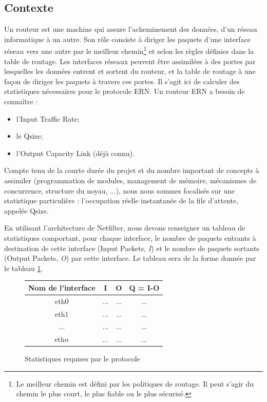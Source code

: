\documentclass[a4paper]{article}
\begin{document}
\subsection{Contexte}
Un routeur est une machine qui assure l’acheminement des données,
d'un réseau informatique à un autre. Son rôle consiste à diriger
les paquets d'une interface réseau vers une autre par le meilleur chemin\footnote{Le meilleur chemin est défini par
les politiques de routage. Il peut s'agir du chemin le plus court, le plus fiable ou le plus sécurisé.} et selon les règles définies dans la table de
routage. 
Les interfaces réseaux peuvent être assimilées à des
portes par lesquelles les données entrent et sortent du routeur, et
la table de routage à une façon de diriger les paquets à travers
ces portes.
Il s'agit ici de calculer des statistiques nécessaires 
pour le protocole ERN. Un routeur ERN a besoin de connaître :
\begin{itemize}
	\item l'Input Traffic Rate;
	\item le Qsize;
	\item l'Output Capacity Link (déjà connu).
\end{itemize}
Compte tenu de la courte durée du projet et 
du nombre important de concepts à assimiler (programmation de modules,
management de mémoire, mécanismes de concurrence, structure du noyau, ...),
nous nous sommes focalisés sur une statistique particulière : l'occupation
réelle instantanée de la file d'attente, appelée Qsize.

En utilisant l'architecture de Netfilter, nous devons renseigner
un tableau de statistiques comportant, pour chaque interface, le
nombre de paquets entrants à destination de cette interface
(Input Packets, \textit{I}) et le nombre de paquets sortants
(Output Packets, \textit{O}) par cette interface. Le tableau sera de la forme donnée par le tableau \ref{stats}.
\begin{figure}[!ht]
	\centering
	\begin{tabular}{c|c|c|c}
		Nom de l'interface & I & O & Q = I-O \\
		\hline
		eth$0$ & $\ldots$ & $\ldots$ & $\ldots$ \\
		eth$1$ & $\ldots$ & $\ldots$ & $\ldots$ \\
		$\ldots$ & $\ldots$ & $\ldots$ & $\ldots$ \\
		eth$n$ & $\ldots$ & $\ldots$ & $\ldots$ \\
	\end{tabular}
	\caption{\label{stats} Statistiques requises par le protocole}
\end{figure}
\end{document}
